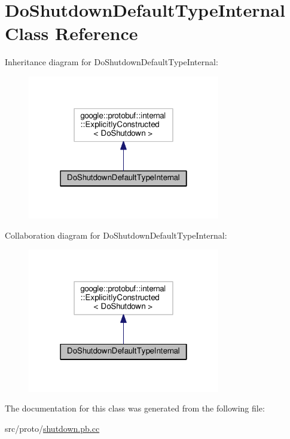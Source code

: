 \hypertarget{class_do_shutdown_default_type_internal}{}\section{Do\+Shutdown\+Default\+Type\+Internal Class Reference}
\label{class_do_shutdown_default_type_internal}


Inheritance diagram for Do\+Shutdown\+Default\+Type\+Internal\+:
\nopagebreak
\begin{figure}[H]
\begin{center}
\leavevmode
\includegraphics[width=238pt]{class_do_shutdown_default_type_internal__inherit__graph}
\end{center}
\end{figure}


Collaboration diagram for Do\+Shutdown\+Default\+Type\+Internal\+:
\nopagebreak
\begin{figure}[H]
\begin{center}
\leavevmode
\includegraphics[width=238pt]{class_do_shutdown_default_type_internal__coll__graph}
\end{center}
\end{figure}


The documentation for this class was generated from the following file\+:\begin{DoxyCompactItemize}
\item 
src/proto/\hyperlink{shutdown_8pb_8cc}{shutdown.\+pb.\+cc}\end{DoxyCompactItemize}

